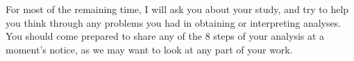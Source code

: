 \documentclass[]{book}
\theoremstyle{definition}
\theoremstyle{definition}
\theoremstyle{definition}
\theoremstyle{remark}
\begin{document}
For most of the remaining time, I will ask you about your study, and try
to help you think through any problems you had in obtaining or
interpreting analyses. You should come prepared to share any of the 8
steps of your analysis at a moment's notice, as we may want to look at
any part of your work.


\end{document}

